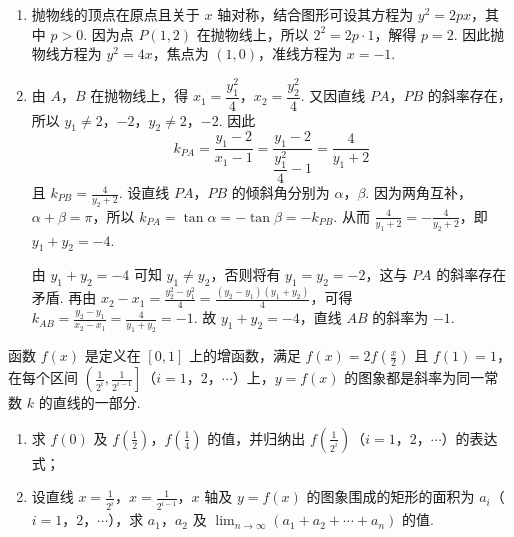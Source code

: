 \begin{solution}
\begin{enumerate}
\item 抛物线的顶点在原点且关于 \(x\) 轴对称，结合图形可设其方程为
\(y^{2}=2px\)，其中 \(p>0\). 因为点 \(P(1,2)\) 在抛物线上，所以
\(2^{2}=2p\cdot1\)，解得 \(p=2\). 因此抛物线方程为 \(y^{2}=4x\)，焦点为 \((1,0)\)，准线方程为
\(x=-1\).

\item 由 \(A\)，\(B\) 在抛物线上，得
\(x_{1}=\dfrac{y_{1}^{2}}{4}\)，\(x_{2}=\dfrac{y_{2}^{2}}{4}\). 又因直线
\(PA\)，\(PB\) 的斜率存在，所以 \(y_{1}\neq2\)，\(-2\)，\(y_{2}\neq2\)，\(-2\). 因此
\[
k_{PA}=\frac{y_{1}-2}{x_{1}-1}
=\frac{y_{1}-2}{\dfrac{y_{1}^{2}}{4}-1}
=\frac{4}{y_{1}+2}
\]
且 \(k_{PB}=\frac{4}{y_{2}+2}\).
设直线 \(PA\)，\(PB\) 的倾斜角分别为 \(\alpha\)，\(\beta\). 因为两角互补，
\(\alpha+\beta=\pi\)，所以
\(k_{PA}=\tan\alpha=-\tan\beta=-k_{PB}\). 从而
\(\frac{4}{y_{1}+2}=-\frac{4}{y_{2}+2}\)，即 \(y_{1}+y_{2}=-4\).

由 \(y_{1}+y_{2}=-4\) 可知 \(y_{1}\neq y_{2}\)，否则将有 \(y_{1}=y_{2}=-2\)，这与 \(PA\) 的斜率存在矛盾. 再由
\(x_{2}-x_{1}=\frac{y_{2}^{2}-y_{1}^{2}}{4}=\frac{(y_{2}-y_{1})(y_{1}+y_{2})}{4}\)，可得
\(k_{AB}=\frac{y_{2}-y_{1}}{x_{2}-x_{1}}=\frac{4}{y_{1}+y_{2}}=-1\).
故 \(y_{1}+y_{2}=-4\)，直线 \(AB\) 的斜率为 \(-1\).
\end{enumerate}
\end{solution}

\begin{problem}
函数 \(f(x)\) 是定义在 \([0,1]\) 上的增函数，满足 \(f(x)=2f\left(\frac{x}{2}\right)\) 且 \(f(1)=1\)，在每个区间 \(\left(\frac{1}{2^{i}},\frac{1}{2^{i-1}}\right]\)（\(i=1\)，\(2\)，\(\cdots\)）上，\(y=f(x)\) 的图象都是斜率为同一常数 \(k\) 的直线的一部分.

\begin{enumerate}
\item 求 \(f(0)\) 及 \(f\left(\frac{1}{2}\right)\)，\(f\left(\frac{1}{4}\right)\) 的值，并归纳出 \(f\left(\frac{1}{2^{i}}\right)\)（\(i=1\)，\(2\)，\(\cdots\)）的表达式；
\item 设直线 \(x=\frac{1}{2^{i}}\)，\(x=\frac{1}{2^{i-1}}\)，\(x\) 轴及 \(y=f(x)\) 的图象围成的矩形的面积为 \(a_{i}\)（\(i=1\)，\(2\)，\(\cdots\)），求 \(a_{1}\)，\(a_{2}\) 及 \(\displaystyle\lim_{n\to\infty}(a_{1}+a_{2}+\cdots+a_{n})\) 的值.
\end{enumerate}
\end{problem}

